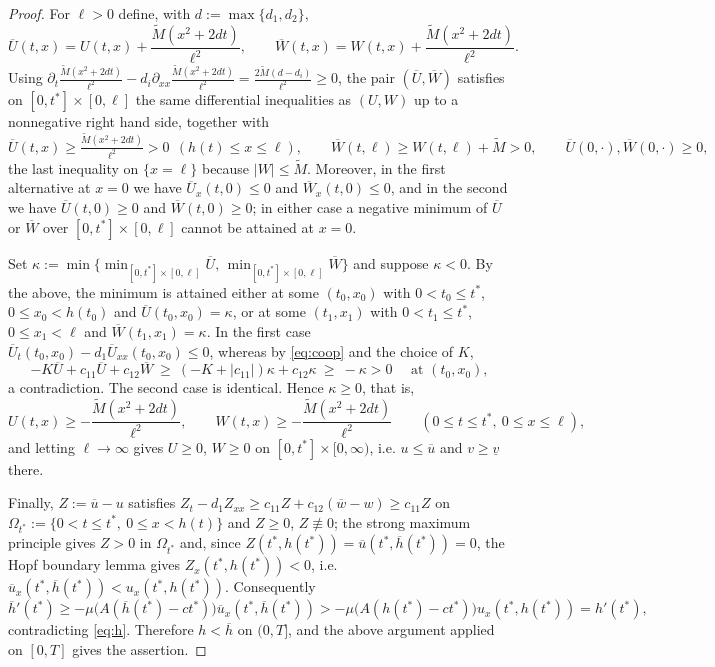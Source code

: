 \documentclass[reqno]{amsart}
\theoremstyle{plain}
\theoremstyle{definition}
\theoremstyle{remark}
\begin{document}
\begin{proof}
	For $\ell>0$ define, with $d:=\max\{d_1,d_2\}$,
	\[
	\overline{U}(t,x) = U(t,x) + \frac{\tilde{M}(x^2 + 2dt)}{\ell^2},
	\qquad
	\overline{W}(t,x) = W(t,x) + \frac{\tilde{M}(x^2 + 2dt)}{\ell^2}.
	\]
	Using $\partial_t\frac{\tilde M(x^2+2dt)}{\ell^2}-d_i\partial_{xx}
	\frac{\tilde M(x^2+2dt)}{\ell^2}=\frac{2\tilde M(d-d_i)}{\ell^2}\ge0$,
	the pair $(\overline{U},\overline{W})$ satisfies on $[0,t^*]\times[0,\ell]$
	the same differential inequalities as $(U,W)$ up to a nonnegative right hand
	side, together with
	\[
	\overline{U}(t,x) \ge \tfrac{\tilde{M}(x^2 + 2dt)}{\ell^2} > 0 \ \ (h(t) \le x \le \ell),\qquad
	\overline{W}(t,\ell) \ge W(t,\ell) + \tilde{M} > 0,\qquad
	\overline{U}(0,\cdot),\overline{W}(0,\cdot)\ge0 ,
	\]
	the last inequality on $\{x=\ell\}$ because $|W|\le\tilde M$. Moreover, in the
	first alternative at $x=0$ we have
	$\overline U_x(t,0)\le0$ and $\overline W_x(t,0)\le0$, and in the second we
	have $\overline U(t,0)\ge0$ and $\overline W(t,0)\ge0$; in either case a
	negative minimum of $\overline U$ or $\overline W$ over
	$[0,t^*]\times[0,\ell]$ cannot be attained at $x=0$.

	Set
	$\kappa := \min\{\min_{[0,t^*]\times[0,\ell]}\overline{U},\,
	\min_{[0,t^*]\times[0,\ell]}\overline{W}\}$ and suppose $\kappa<0$. By the
	above, the minimum is attained either at some $(t_0,x_0)$ with
	$0<t_0\le t^*$, $0\le x_0<h(t_0)$ and $\overline U(t_0,x_0)=\kappa$, or at some
	$(t_1,x_1)$ with $0<t_1\le t^*$, $0\le x_1<\ell$ and
	$\overline W(t_1,x_1)=\kappa$. In the first case
	$\overline{U}_t(t_0,x_0)-d_1\overline{U}_{xx}(t_0,x_0)\le0$, whereas by
	\eqref{eq:coop} and the choice of $K$,
	\[
	-K\overline{U} + c_{11} \overline{U} + c_{12}\overline{W}
	\ \ge\ (-K + |c_{11}|)\kappa + c_{12}\kappa \ \ge\ -\kappa > 0
	\quad\text{ at }(t_0,x_0),
	\]
	a contradiction. The second case is identical. Hence $\kappa\ge0$, that is,
	\[
	U(t,x) \ge -\frac{\tilde{M}(x^2 + 2dt)}{\ell^2},
	\qquad W(t,x) \ge -\frac{\tilde{M}(x^2 + 2dt)}{\ell^2}
	\qquad (0\le t\le t^*,\ 0\le x\le\ell),
	\]
	and letting $\ell\to\infty$ gives $U\ge0$, $W\ge0$ on
	$[0,t^*]\times[0,\infty)$, i.e. $u\le\overline{u}$ and $v\ge\underline{v}$
	there.

	Finally, $Z:=\overline{u}-u$ satisfies
	$Z_t-d_1Z_{xx}\ge c_{11}Z+c_{12}(\overline{w}-w)\ge c_{11}Z$ on
	$\Omega_{t^*}:=\{0<t\le t^*,\ 0\le x<h(t)\}$ and $Z\ge0$, $Z\not\equiv0$;
	the strong maximum principle gives $Z>0$ in $\Omega_{t^*}$ and, since
	$Z(t^*,h(t^*))=\overline u(t^*,\overline h(t^*))=0$, the Hopf boundary lemma
	gives $Z_x(t^*,h(t^*))<0$, i.e. $\overline u_x(t^*,\overline h(t^*))<u_x(t^*,h(t^*))$.
	Consequently
	\[
	\overline h'(t^*)\ge-\mu\big(A(\overline h(t^*)-ct^*)\big)\overline u_x(t^*,\overline h(t^*))
	>-\mu\big(A(h(t^*)-ct^*)\big)u_x(t^*,h(t^*))=h'(t^*),
	\]
	contradicting \eqref{eq:h}. Therefore $h<\overline{h}$ on $(0,T]$, and the
	above argument applied on $[0,T]$ gives the assertion.


\end{proof}
\end{document}
